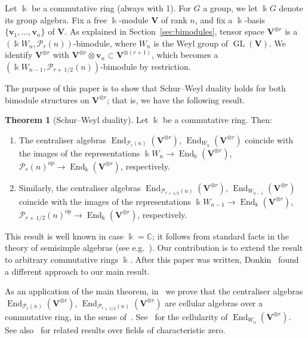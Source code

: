 \documentclass[10pt]{article}
\theoremstyle{definition}
\providecommand{\eg}{e.g.\ }
\newtheorem*{theo*}{Theorem}
\DeclareMathOperator{\GL}{GL}
\DeclareMathOperator{\End}{End}
\DeclareMathOperator{\op}{op}
\newcommand{\C}{\mathbb{C}}
\newcommand{\Ptn}{\mathcal{P}}
\newcommand{\V}{\mathbf{V}} %
\newcommand{\bv}{\mathbf{v}} %
\newcommand{\half}{\, 1/2} %
\begin{document}
Let $\Bbbk$ be a commutative ring (always with 1). 
For $G$ a group, we let $\Bbbk G$ denote its group algebra. 
Fix a free
$\Bbbk$-module $\V$ of rank $n$, and fix a $\Bbbk$-basis $\{\bv_1,
\dots, \bv_n\}$ of $\V$. As explained in Section~\ref{sec:bimodules},
tensor space $\V^{\otimes r}$ is a $(\Bbbk W_n, \Ptn_r(n))$-bimodule,
where $W_n$ is the Weyl group of $\GL(\V)$. We identify $\V^{\otimes
 r}$ with $\V^{\otimes r} \otimes \bv_n \subset \V^{\otimes (r+1)}$,
which becomes a $(\Bbbk W_{n-1}, \Ptn_{r+\half}(n))$-bimodule by
restriction.

The purpose of this paper is to show that Schur--Weyl duality holds
for both bimodule structures on $\V^{\otimes r}$; that is, we have
the following result.


\begin{theo*}[Schur--Weyl duality]
 Let $\Bbbk$ be a commutative ring. Then:
 \begin{enumerate}[label=(\alph*)]
 \item\label{theo*_a} The centraliser algebras $\End_{\Ptn_r(n)}(\V^{\otimes r})$,
 $\End_{W_n}(\V^{\otimes r})$ coincide with the images of the
 representations $\Bbbk W_n \to \End_\Bbbk(\V^{\otimes r})$,
 $\Ptn_r(n)^{\op} \to \End_\Bbbk(\V^{\otimes r})$, respectively.
 
 \item\label{theo*_b}  Similarly, the centraliser algebras
 $\End_{\Ptn_{r+\half}(n)}(\V^{\otimes r})$,
 $\End_{W_{n-1}}(\V^{\otimes r})$ coincide with the images of the
 representations $\Bbbk W_{n-1} \to \End_\Bbbk(\V^{\otimes r})$,
 $\Ptn_{r+\half}(n)^{\op} \to \End_\Bbbk(\V^{\otimes r})$,
 respectively.
 \end{enumerate}
\end{theo*}

This result is well known in case $\Bbbk=\C$; it follows from standard
facts in the theory of semisimple algebras (see \eg \cite[Thms~5.4,
 3.6]{HR-2005}). Our contribution is to extend the result to
arbitrary commutative rings $\Bbbk$. After this paper was written,
Donkin~\cite{Donkin:Double} found a different approach to our main
result.

As an application of the main theorem, in~\cite[Cor.~7.6]{BDM:second}
we prove that the centraliser algebras $\End_{\Ptn_r(n)}(\V^{\otimes
 r})$, $\End_{\Ptn_{r+\half}(n)}(\V^{\otimes r})$ are cellular
algebras over a commutative ring, in the sense of~\cite{Graham-Lehrer}. See~\cite{Donkin:Cellularity} for the
cellularity of $\End_{W_n}(\V^{\otimes r})$. See also~\cite{BH:2,
 BH:1} for related results over fields of characteristic zero.
\end{document}
